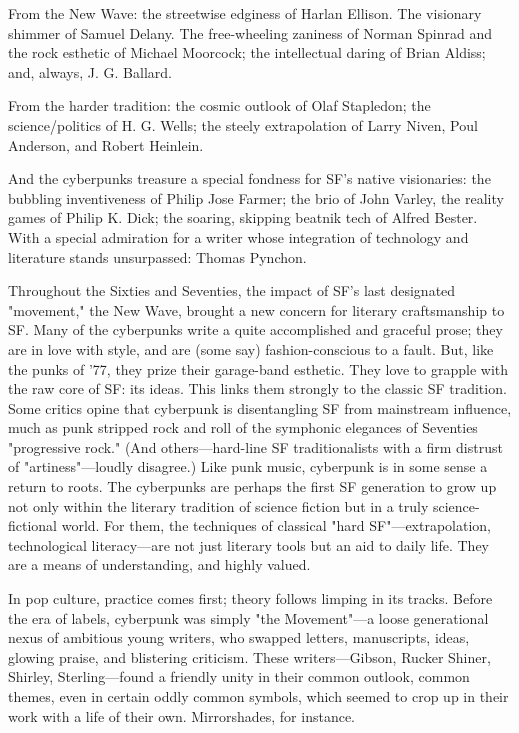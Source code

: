 From the New Wave: the streetwise edginess of Harlan Ellison. The visionary shimmer of Samuel Delany. The free-wheeling zaniness of Norman Spinrad and the rock esthetic of Michael Moorcock; the intellectual daring of Brian Aldiss; and, always, J. G. Ballard.

From the harder tradition: the cosmic outlook of Olaf Stapledon; the science/politics of H. G. Wells; the steely extrapolation of Larry Niven, Poul Anderson, and Robert Heinlein.

And the cyberpunks treasure a special fondness for SF's native visionaries: the bubbling inventiveness of Philip Jose Farmer; the brio of John Varley, the reality games of Philip K. Dick; the soaring, skipping beatnik tech of Alfred Bester. With a special admiration for a writer whose integration of technology and literature stands unsurpassed: Thomas Pynchon.

Throughout the Sixties and Seventies, the impact of SF's last designated "movement," the New Wave, brought a new concern for literary craftsmanship to SF. Many of the cyberpunks write a quite accomplished and graceful prose; they are in love with style, and are (some say) fashion-conscious to a fault. But, like the punks of '77, they prize their garage-band esthetic. They love to grapple with the raw core of SF: its ideas. This links them strongly to the classic SF tradition. Some critics opine that cyberpunk is disentangling SF from mainstream influence, much as punk stripped rock and roll of the symphonic elegances of Seventies "progressive rock." (And others—hard-line SF traditionalists with a firm distrust of "artiness"—loudly disagree.) Like punk music, cyberpunk is in some sense a return to roots. The cyberpunks are perhaps the first SF generation to grow up not only within the literary tradition of science fiction but in a truly science-fictional world. For them, the techniques of classical "hard SF"—extrapolation, technological literacy—are not just literary tools but an aid to daily life. They are a means of understanding, and highly valued.

In pop culture, practice comes first; theory follows limping in its tracks. Before the era of labels, cyberpunk was simply "the Movement"—a loose generational nexus of ambitious young writers, who swapped letters, manuscripts, ideas, glowing praise, and blistering criticism. These writers—Gibson, Rucker Shiner, Shirley, Sterling—found a friendly unity in their common outlook, common themes, even in certain oddly common symbols, which seemed to crop up in their work with a life of their own. Mirrorshades, for instance.

